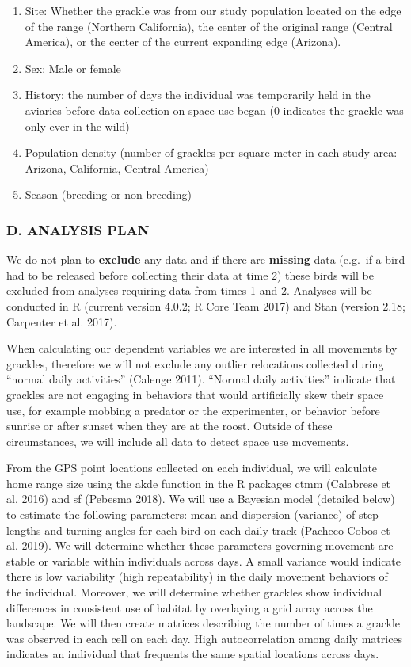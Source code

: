\documentclass[
]{article}
\begin{document}
\begin{enumerate}
\def\labelenumi{\arabic{enumi})}
\item
  Site: Whether the grackle was from our study population located on the
  edge of the range (Northern California), the center of the original
  range (Central America), or the center of the current expanding edge
  (Arizona).
\item
  Sex: Male or female
\item
  History: the number of days the individual was temporarily held in the
  aviaries before data collection on space use began (0 indicates the
  grackle was only ever in the wild)
\item
  Population density (number of grackles per square meter in each study
  area: Arizona, California, Central America)
\item
  Season (breeding or non-breeding)
\end{enumerate}

\hypertarget{d.-analysis-plan}{%
\subsubsection{D. ANALYSIS PLAN}\label{d.-analysis-plan}}

We do not plan to \textbf{exclude} any data and if there are
\textbf{missing} data (e.g.~if a bird had to be released before
collecting their data at time 2) these birds will be excluded from
analyses requiring data from times 1 and 2. Analyses will be conducted
in R (current version 4.0.2; R Core Team 2017) and Stan (version 2.18;
Carpenter et al. 2017).

When calculating our dependent variables we are interested in all
movements by grackles, therefore we will not exclude any outlier
relocations collected during ``normal daily activities'' (Calenge 2011).
``Normal daily activities'' indicate that grackles are not engaging in
behaviors that would artificially skew their space use, for example
mobbing a predator or the experimenter, or behavior before sunrise or
after sunset when they are at the roost. Outside of these circumstances,
we will include all data to detect space use movements.

From the GPS point locations collected on each individual, we will
calculate home range size using the akde function in the R packages ctmm
(Calabrese et al. 2016) and sf (Pebesma 2018). We will use a Bayesian
model (detailed below) to estimate the following parameters: mean and
dispersion (variance) of step lengths and turning angles for each bird
on each daily track (Pacheco-Cobos et al. 2019). We will determine
whether these parameters governing movement are stable or variable
within individuals across days. A small variance would indicate there is
low variability (high repeatability) in the daily movement behaviors of
the individual. Moreover, we will determine whether grackles show
individual differences in consistent use of habitat by overlaying a grid
array across the landscape. We will then create matrices describing the
number of times a grackle was observed in each cell on each day. High
autocorrelation among daily matrices indicates an individual that
frequents the same spatial locations across days.
\end{document}
